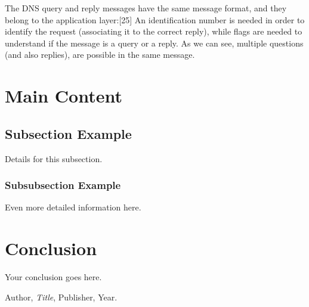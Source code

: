 \noindent The DNS query and reply messages have the same message format, and they belong to the application layer:[25]
An identification number is needed in order to identify the request (associating it to the correct reply), while flags are needed to understand if the message is a query or a reply. As we can see, multiple questions (and also replies), are possible in the same message.

\section{Main Content}
\subsection{Subsection Example}
Details for this subsection.

\subsubsection{Subsubsection Example}
Even more detailed information here.

\section{Conclusion}
Your conclusion goes here.

\begin{thebibliography}{9}
 Author, \textit{Title}, Publisher, Year.
\end{thebibliography}

